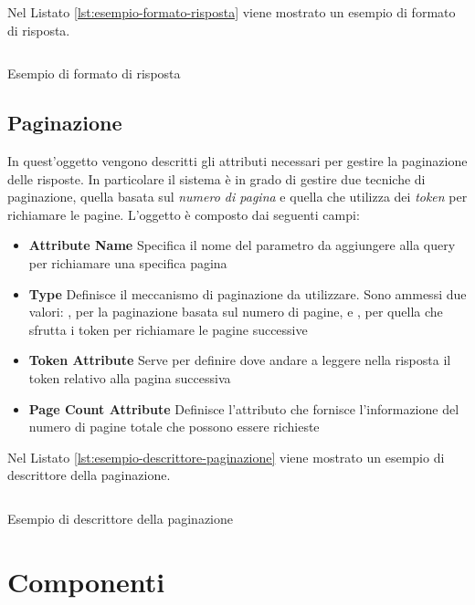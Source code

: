 Nel Listato \ref{lst:esempio-formato-risposta} viene mostrato un esempio di formato di risposta.

\begin{listing}[H]
	\inputminted{json}{5-implementazione-backend/Codice/esempio_formato_risposta.json}
	\caption{Esempio di formato di risposta}
	\label{lst:esempio-formato-risposta}
\end{listing}

\subsection{Paginazione\label{sec:descrittore-paginazione}}

In quest'oggetto vengono descritti gli attributi necessari per gestire la paginazione delle risposte. In particolare il sistema è in grado di gestire due tecniche di paginazione, quella basata sul \emph{numero di pagina} e quella che utilizza dei \emph{token} per richiamare le pagine. L'oggetto è composto dai seguenti campi:

\begin{itemize}
	\item \textbf{Attribute Name}
	Specifica il nome del parametro da aggiungere alla query per richiamare una specifica pagina
	\item \textbf{Type}
	Definisce il meccanismo di paginazione da utilizzare. Sono ammessi due valori: , per la paginazione basata sul numero di pagine, e , per quella che sfrutta i token per richiamare le pagine successive
	\item \textbf{Token Attribute}
	Serve per definire dove andare a leggere nella risposta il token relativo alla pagina successiva
	\item \textbf{Page Count Attribute}
	Definisce l'attributo che fornisce l'informazione del numero di pagine totale che possono essere richieste
\end{itemize}

Nel Listato \ref{lst:esempio-descrittore-paginazione} viene mostrato un esempio di descrittore della paginazione.

\begin{listing}[H]
	\inputminted{json}{5-implementazione-backend/Codice/esempio_descrittore_paginazione.json}
	\caption{Esempio di descrittore della paginazione}
	\label{lst:esempio-descrittore-paginazione}
\end{listing}

\section{Componenti\label{sec:componenti-backend}}

